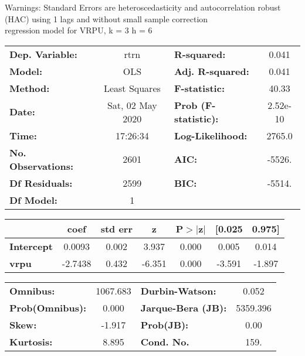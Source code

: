 Warnings: \newline
 [1] Standard Errors are heteroscedasticity and autocorrelation robust (HAC) using 1 lags and without small sample correction\\ 

regression model for VRPU, k = 3 h = 6\begin{center}
\begin{tabular}{lclc}
\toprule
\textbf{Dep. Variable:}    &       rtrn       & \textbf{  R-squared:         } &     0.041   \\
\textbf{Model:}            &       OLS        & \textbf{  Adj. R-squared:    } &     0.041   \\
\textbf{Method:}           &  Least Squares   & \textbf{  F-statistic:       } &     40.33   \\
\textbf{Date:}             & Sat, 02 May 2020 & \textbf{  Prob (F-statistic):} &  2.52e-10   \\
\textbf{Time:}             &     17:26:34     & \textbf{  Log-Likelihood:    } &    2765.0   \\
\textbf{No. Observations:} &        2601      & \textbf{  AIC:               } &    -5526.   \\
\textbf{Df Residuals:}     &        2599      & \textbf{  BIC:               } &    -5514.   \\
\textbf{Df Model:}         &           1      & \textbf{                     } &             \\
\bottomrule
\end{tabular}
\begin{tabular}{lcccccc}
                   & \textbf{coef} & \textbf{std err} & \textbf{z} & \textbf{P$> |$z$|$} & \textbf{[0.025} & \textbf{0.975]}  \\
\midrule
\textbf{Intercept} &       0.0093  &        0.002     &     3.937  &         0.000        &        0.005    &        0.014     \\
\textbf{vrpu}      &      -2.7438  &        0.432     &    -6.351  &         0.000        &       -3.591    &       -1.897     \\
\bottomrule
\end{tabular}
\begin{tabular}{lclc}
\textbf{Omnibus:}       & 1067.683 & \textbf{  Durbin-Watson:     } &    0.052  \\
\textbf{Prob(Omnibus):} &   0.000  & \textbf{  Jarque-Bera (JB):  } & 5359.396  \\
\textbf{Skew:}          &  -1.917  & \textbf{  Prob(JB):          } &     0.00  \\
\textbf{Kurtosis:}      &   8.895  & \textbf{  Cond. No.          } &     159.  \\
\bottomrule
\end{tabular}
\end{center}

